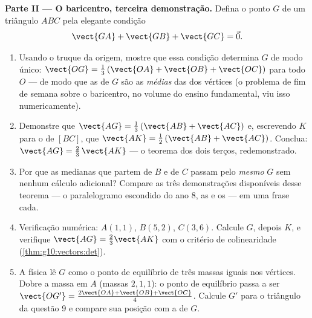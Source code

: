 \begin{problem}
\medskip
\noindent\textbf{Parte II --- O baricentro, terceira demonstração.}
Defina o ponto $G$ de um triângulo $ABC$ pela elegante condição
\[
\vect{GA} + \vect{GB} + \vect{GC} = \vec 0 .
\]
\begin{enumerate}[resume]
  \item Usando o truque da origem, mostre que essa condição
        determina $G$ de modo único:
        $\vect{OG} = \frac13\left(\vect{OA} + \vect{OB} +
        \vect{OC}\right)$ para todo $O$ --- de modo que as
         de $G$ são as \emph{médias} das dos vértices
        (o problema de fim de semana sobre o baricentro, no
        volume do ensino fundamental, viu isso numericamente).
  \item Demonstre que $\vect{AG} = \frac13\left(\vect{AB} +
        \vect{AC}\right)$ e, escrevendo $K$ para o  de
        $[BC]$, que $\vect{AK} = \frac12\left(\vect{AB} +
        \vect{AC}\right)$. Conclua:
        $\vect{AG} = \frac23\,\vect{AK}$ --- o teorema dos dois
        terços, redemonstrado.
  \item Por que as medianas que partem de $B$ e de $C$ passam
        pelo \emph{mesmo} $G$ sem nenhum cálculo adicional?
        Compare as três demonstrações disponíveis desse teorema
        --- o paralelogramo escondido do ano 8, as  e
        os  --- em uma frase cada.
  \item Verificação numérica: $A(1, 1)$, $B(5, 2)$, $C(3, 6)$.
        Calcule $G$, depois $K$, e verifique
        $\vect{AG} = \frac23 \vect{AK}$ com o critério de
        colinearidade (\cref{thm:g10:vectors:det}).
  \item A física lê $G$ como o ponto de equilíbrio de três massas
        iguais nos vértices. Dobre a massa em $A$ (massas
        $2, 1, 1$): o ponto de equilíbrio passa a ser
        $\vect{OG'} = \frac{2\vect{OA} + \vect{OB} +
        \vect{OC}}{4}$. Calcule $G'$ para o triângulo da questão
        9 e compare sua posição com a de $G$.
\end{enumerate}


\end{problem}
